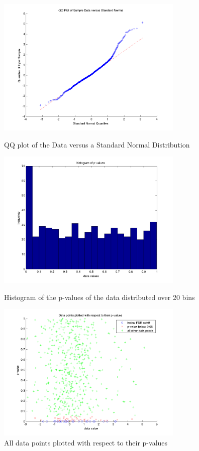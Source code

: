 \documentclass{acm_proc_article-sp}
\begin{document}
\begin{figure}[t]
\centering
\includegraphics[width=3.5in]{qq.png}
\caption{QQ plot of the Data versus a Standard Normal Distribution}

   \includegraphics[width=3.5in]{hist-p.png}
\caption{Histogram of the p-values of the data distributed over 20 bins}

   \includegraphics[width=3.5in]{all-data.png}
\caption{All data points plotted with respect to their p-values}
\end{figure}

  
%


%
%

\balancecolumns
\end{document}
